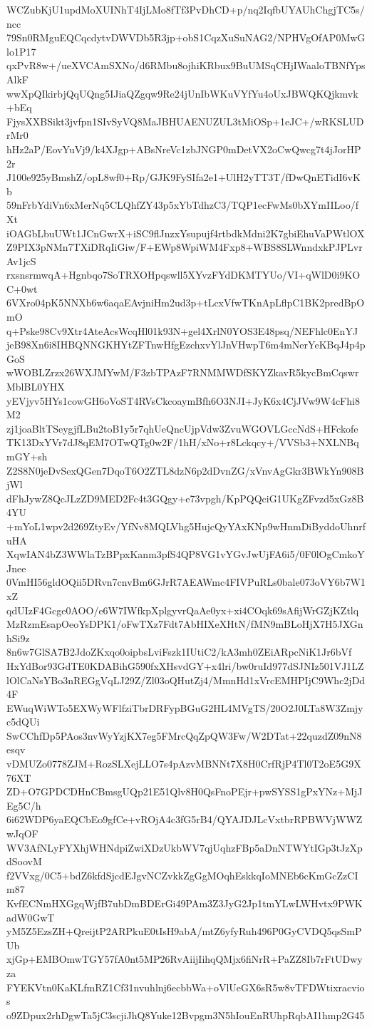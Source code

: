 WCZubKjU1updMoXUINhT4IjLMo8fTf3PvDhCD+p/nq2IqfbUYAUhChgjTC5s/ncc
79Sn0RMguEQCqcdytvDWVDb5R3jp+obS1CqzXuSuNAG2/NPHVgOfAP0MwGlo1P17
qxPvR8w+/ueXVCAmSXNo/d6RMbu8ojhiKRbux9BuUMSqCHjIWaaloTBNfYpsAlkF
wwXpQIkirbjQqUQng5IJiaQZgqw9Re24jUnIbWKuVYfYu4oUxJBWQKQjkmvk+bEq
FjysXXBSikt3jvfpn1SIvSyVQ8MaJBHUAENUZUL3tMiOSp+1eJC+/wRKSLUDrMr0
hHz2aP/EovYuVj9/k4XJgp+ABsNreVc1zbJNGP0mDetVX2oCwQwcg7t4jJorHP2r
J100e925yBmshZ/opL8wf0+Rp/GJK9FySIfa2e1+UlH2yTT3T/fDwQnETidI6vKb
59nFrbYdiVn6xMerNq5CLQhfZY43p5xYbTdhzC3/TQP1ecFwMs0bXYmIILoo/fXt
iOAGbLbuUWt1JCnGwrX+iSC9flJnzxYsupujf4rtbdkMdni2K7gbiEhuVaPWtlOX
Z9PIX3pNMn7TXiDRqIiGiw/F+EWp8WpiWM4Fxp8+WBS8SLWnndxkPJPLvrAv1jcS
rxsnsrmwqA+Hgnbqo7SoTRXOHpqswll5XYvzFYdDKMTYUo/VI+qWlD0i9KOC+0wt
6VXro04pK5NNXb6w6aqaEAvjniHm2ud3p+tLcxVfwTKnApLflpC1BK2predBpOmO
q+Pske98Cv9Xtr4AteAcsWcqHl01k93N+gel4XrlN0YOS3E48psq/NEFhlc0EnYJ
jeB98Xn6i8IHBQNNGKHYtZFTnwHfgEzchxvYlJnVHwpT6m4mNerYeKBqJ4p4pGoS
wWOBLZrzx26WXJMYwM/F3zbTPAzF7RNMMWDfSKYZkavR5kycBmCqswrMblBL0YHX
yEVjyv5HYs1cowGH6oVoST4RVsCkcoaymBfh6O3NJI+JyK6x4CjJVw9W4cFhi8M2
zj1joaBltTSeygjfLBu2toB1y5r7qhUeQncUjpVdw3ZvuWGOVLGccNdS+HFckofe
TK13DxYVr7dJ8qEM7OTwQTg0w2F/1hH/xNo+r8Lckqcy+/VVSb3+NXLNBqmGY+sh
Z2S8N0jeDvSexQGen7DqoT6O2ZTL8dzN6p2dDvnZG/xVnvAgGkr3BWkYn908BjWl
dFhJywZ8QcJLzZD9MED2Fc4t3GQgy+e73vpgh/KpPQQciG1UKgZFvzd5xGz8B4YU
+mYoL1wpv2d269ZtyEv/YfNv8MQLVhg5HujcQyYAxKNp9wHnmDiByddoUhnrfuHA
XqwIAN4bZ3WWlaTzBPpxKanm3pfS4QP8VG1vYGvJwUjFA6i5/0F0lOgCmkoYJnee
0VmHI56gldOQii5DRvn7cnvBm6GJrR7AEAWmc4FIVPuRLs0bale073oVY6b7W1xZ
qdUIzF4Gcge0AOO/e6W7IWfkpXplgyvrQaAe0yx+xi4COqk69sAfijWrGZjKZtlq
MzRzmEsapOeoYsDPK1/oFwTXz7Fdt7AbHIXeXHtN/fMN9mBLoHjX7H5JXGnhSi9z
8n6w7GlSA7B2JdoZKxqo0oipbsLviFszk1IUtiC2/kA3mh0ZEiARpcNiK1Jr6bVf
HxYdBor93GdTE0KDABihG590fxXHsvdGY+x4lri/bw0ruId977dSJNIz501VJ1LZ
lOlCaNsYBo3nREGgVqLJ29Z/Zl03oQHutZj4/MmnHd1xVrcEMHPIjC9Whc2jDd4F
EWuqWiWTo5EXWyWFlfziTbrDRFypBGuG2HL4MVgTS/20O2J0LTa8W3Zmjyc5dQUi
SwCChfDp5PAos3nvWyYzjKX7eg5FMrcQqZpQW3Fw/W2DTat+22quzdZ09nN8esqv
vDMUZo0778ZJM+RozSLXejLLO7s4pAzvMBNNt7X8H0CrfRjP4Tl0T2oE5G9X76XT
ZD+O7GPDCDHnCBmsgUQp21E51Qlv8H0QsFnoPEjr+pwSYSS1gPxYNz+MjJEg5C/h
6i62WDP6yaEQCbEo9gfCe+vROjA4c3fG5rB4/QYAJDJLcVxtbrRPBWVjWWZwJqOF
WV3AfNLyFYXhjWHNdpiZwiXDzUkbWV7qjUqhzFBp5aDnNTWYtIGp3tJzXpdSoovM
f2VVxg/0C5+bdZ6kfdSjcdEJgvNCZvkkZgGgMOqhEskkqIoMNEb6cKmGcZzCIm87
KvfECNmHXGgqWjfB7ubDmBDErGi49PAm3Z3JyG2Jp1tmYLwLWHvtx9PWKadW0GwT
yM5Z5EzsZH+QreijtP2ARPkuE0tIsH9abA/mtZ6yfyRuh496P0GyCVDQ5qsSmPUb
xjGp+EMBOmwTGY57fA0nt5MP26RvAiijIihqQMjx6fiNrR+PaZZ8Ib7rFtUDwyza
FYEKVtn0KaKLfmRZ1Cf31nvuhlnj6ecbbWa+oVlUeGX6sR5w8vTFDWtixracvios
o9ZDpux2rhDgwTa5jC3scjiJhQ8Yuke12Bvpgm3N5hIouEnRUhpRqbAI1hmp2G45
